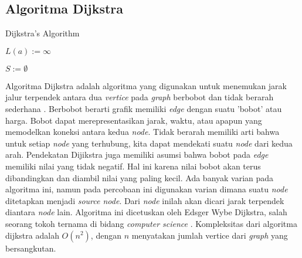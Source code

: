 \documentclass[conference]{IEEEtran}
\begin{document}
\subsection{Algoritma Dijkstra}
    \begin{algorithm}
        \caption{Dijkstra's Algorithm}\label{alg:one}

        

        $L(a) := \infty$

        $S := \emptyset$


        
    \end{algorithm}
    Algoritma Dijkstra adalah algoritma yang digunakan untuk
    menemukan jarak jalur terpendek antara dua \textit{vertice} pada
    \textit{graph} berbobot dan tidak berarah sederhana \cite{rosen2012discrete}. Berbobot
    berarti grafik memiliki \textit{edge} dengan suatu ’bobot’ atau harga.
    Bobot dapat merepresentasikan jarak, waktu, atau apapun
    yang memodelkan koneksi antara kedua \textit{node}. Tidak berarah
    memiliki arti bahwa untuk setiap \textit{node} yang terhubung, kita
    dapat mendekati suatu \textit{node} dari kedua arah. Pendekatan Dijikstra
    juga memiliki asumsi bahwa bobot pada \textit{edge} memiliki
    nilai yang tidak negatif. Hal ini karena nilai bobot akan
    terus dibandingkan dan diambil nilai yang paling kecil. Ada
    banyak varian pada algoritma ini, namun pada percobaan
    ini digunakan varian dimana suatu \textit{node} ditetapkan menjadi
    \textit{source node}. Dari \textit{node} inilah akan dicari jarak terpendek
    diantara \textit{node} lain. Algoritma ini dicetuskan oleh Edsger
    Wybe Dijkstra, salah seorang tokoh ternama di bidang \textit{computer
    science} \cite{dijkstra1959note}. Kompleksitas dari algoritma dijkstra adalah
    $O(n^2)$, dengan $n$ menyatakan jumlah vertice dari \textit{graph} yang
    bersangkutan.
\end{document}
